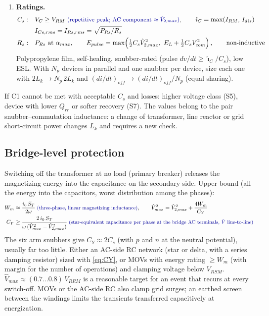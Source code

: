 \documentclass[10pt,a4paper]{scrartcl}
\newcommand{\Lk}{L_{k}}
\newcommand{\VRRM}{V_{RRM}}
\newcommand{\VRSM}{V_{RSM}}
\newcommand{\rt}[1]{\text{\small\color{blue!60!black} #1}}
\begin{document}
\begin{enumerate}[label=\textbf{C\arabic*},leftmargin=*]
\item \textbf{Ratings.}
\begin{align}
C_s:&\quad V_{C} \ge V_{RM}\ \rt{(repetitive peak; AC component $\approx\hat V_{2,max}$)}, \qquad
\hat\imath_C = \max(I_{RM},\,I_{dis}) \notag\\
&\quad I_{Cs,rms} = I_{Rs,rms} = \sqrt{P_{Rs}/R_s} \label{eq:Csrat}\\
R_s:&\quad P_{Rs}\ \text{at}\ \alpha_{max}, \qquad
E_{pulse} = \max\!\left(\tfrac12C_s\hat V_{2,max}^2,\ E_L + \tfrac12C_sV_{com}^2\right), \qquad \text{non-inductive} \label{eq:Rrat}
\end{align}
Polypropylene film, self-healing, snubber-rated (pulse $dv/dt \ge \hat\imath_C/C_s$), low ESL. With $N_p$ devices in parallel and one snubber per device, size each one with $2\Lk\to N_p\,2\Lk$ and $(di/dt)_{off}\to(di/dt)_{off}/N_p$ (equal sharing).
\end{enumerate}
If C1 cannot be met with acceptable $C_s$ and losses: higher voltage class (S5), device with lower $Q_{rr}$ or softer recovery (S7). The values belong to the pair snubber--commutation inductance: a change of transformer, line reactor or grid short-circuit power changes $\Lk$ and requires a new check.

\subsection{Bridge-level protection}\label{sec:snubbridge}
Switching off the transformer at no load (primary breaker) releases the magnetizing energy into the capacitance on the secondary side. Upper bound (all the energy into the capacitors, worst distribution among the phases):
\begin{align}
W_m &\approx \frac{i_0\,S_T}{2\omega} \;\rt{(three-phase, linear magnetizing inductance)}, \qquad
\hat V_{max}^2 = \hat V_{2,max}^2 + \frac{4W_m}{C_Y} \label{eq:Wm}\\
C_Y &\ge \frac{2\,i_0\,S_T}{\omega\,(\hat V_{max}^2 - \hat V_{2,max}^2)} \;\rt{(star-equivalent capacitance per phase at the bridge AC terminals, $\hat V$ line-to-line)} \label{eq:CY}
\end{align}
The six arm snubbers give $C_Y\approx2C_s$ (with $p$ and $n$ at the neutral potential), usually far too little. Either an AC-side RC network (star or delta, with a series damping resistor) sized with \eqref{eq:CY}, or MOVs with energy rating $\ge W_m$ (with margin for the number of operations) and clamping voltage below $\VRSM$. $\hat V_{max}\approx(0.7\ldots0.8)\,\VRRM$ is a reasonable target for an event that recurs at every switch-off. MOVs or the AC-side RC also clamp grid surges; an earthed screen between the windings limits the transients transferred capacitively at energization.
\end{document}
